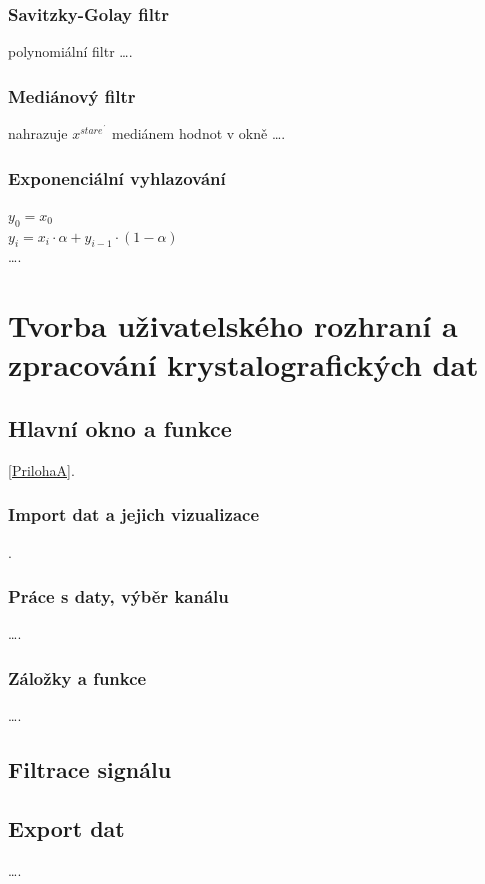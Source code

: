 \documentclass[a4paper, 12pt]{article}
\begin{document}
\subsubsection{Savitzky-Golay filtr}
\label{sec:filtr2}
polynomiální filtr
\ldots .

\subsubsection{Mediánový filtr}
\label{sec:filtr3}
nahrazuje \(x^{stare^{´}}\) mediánem hodnot v okně
\ldots .

\subsubsection{Exponenciální vyhlazování}
\label{sec:filtr4}
\(y_0 = x_0\)\\
\(y_i = x_i · \alpha + y_{i-1} · (1-\alpha)\)\\
\ldots .


\newpage
\section{Tvorba uživatelského rozhraní a zpracování krystalografických dat}

\subsection{Hlavní okno a funkce}
\ref{PrilohaA}.
\subsubsection{Import dat a jejich vizualizace}
\cite{petz08}.
\subsubsection{Práce s daty, výběr kanálu}
\ldots .
\subsubsection{Záložky a funkce}
\ldots .

\subsection{Filtrace signálu}

\subsection{Export dat}
\ldots .
\end{document}

